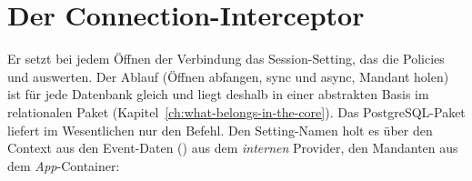 \section{Der Connection-Interceptor}

Er setzt bei jedem Öffnen der Verbindung das Session-Setting, das die Policies und
 auswerten. Der Ablauf (Öffnen abfangen,
sync und async, Mandant holen) ist für jede Datenbank gleich und liegt deshalb in einer
abstrakten Basis im relationalen Paket (Kapitel~\ref{ch:what-belongs-in-the-core}). Das
PostgreSQL-Paket liefert im Wesentlichen nur den Befehl. Den Setting-Namen holt es über den Context aus den
Event-Daten
() aus dem
\emph{internen} Provider, den Mandanten aus dem \emph{App}-Container:

